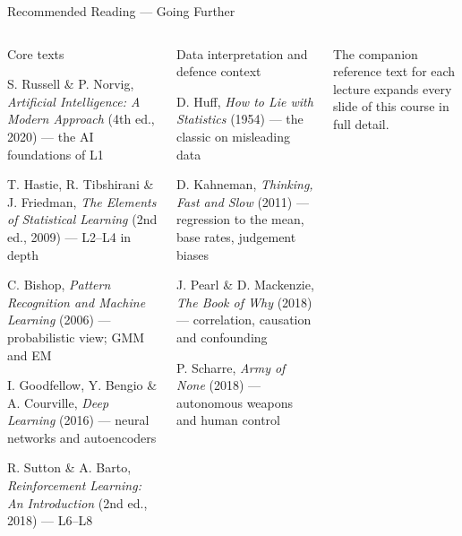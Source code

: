 \documentclass[aspectratio=169,10pt,t]{beamer}
\begin{document}
\begin{frame}{Recommended Reading --- Going Further}
\begin{columns}[T]
\begin{cbox}[ISSAnavy]{Core texts}\scriptsize\begin{tl}\item S. Russell \& P. Norvig, \textit{Artificial Intelligence: A Modern Approach} (4th ed., 2020) --- the AI foundations of L1\item T. Hastie, R. Tibshirani \& J. Friedman, \textit{The Elements of Statistical Learning} (2nd ed., 2009) --- L2--L4 in depth\item C. Bishop, \textit{Pattern Recognition and Machine Learning} (2006) --- probabilistic view; GMM and EM\item I. Goodfellow, Y. Bengio \& A. Courville, \textit{Deep Learning} (2016) --- neural networks and autoencoders\item R. Sutton \& A. Barto, \textit{Reinforcement Learning: An Introduction} (2nd ed., 2018) --- L6--L8\end{tl}\end{cbox}
\begin{cbox}[AccentCol]{Data interpretation and defence context}\scriptsize\begin{tl}\item D. Huff, \textit{How to Lie with Statistics} (1954) --- the classic on misleading data\item D. Kahneman, \textit{Thinking, Fast and Slow} (2011) --- regression to the mean, base rates, judgement biases\item J. Pearl \& D. Mackenzie, \textit{The Book of Why} (2018) --- correlation, causation and confounding\item P. Scharre, \textit{Army of None} (2018) --- autonomous weapons and human control\end{tl}\end{cbox}
\begin{ibox}\scriptsize The companion reference text for each lecture expands every slide of this course in full detail.\end{ibox}
\end{columns}
\end{frame}
\end{document}
